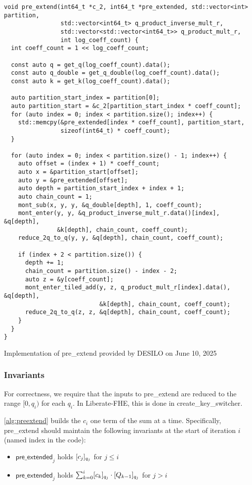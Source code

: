 \documentclass{article}
\begin{document}
\begin{listing}
\begin{verbatim}
void pre_extend(int64_t *c_2, int64_t *pre_extended, std::vector<int> partition,
                std::vector<int64_t> q_product_inverse_mult_r,
                std::vector<std::vector<int64_t>> q_product_mult_r,
                int log_coeff_count) {
  int coeff_count = 1 << log_coeff_count;

  const auto q = get_q(log_coeff_count).data();
  const auto q_double = get_q_double(log_coeff_count).data();
  const auto k = get_k(log_coeff_count).data();

  auto partition_start_index = partition[0];
  auto partition_start = &c_2[partition_start_index * coeff_count];
  for (auto index = 0; index < partition.size(); index++) {
    std::memcpy(&pre_extended[index * coeff_count], partition_start,
                sizeof(int64_t) * coeff_count);
  }

  for (auto index = 0; index < partition.size() - 1; index++) {
    auto offset = (index + 1) * coeff_count;
    auto x = &partition_start[offset];
    auto y = &pre_extended[offset];
    auto depth = partition_start_index + index + 1;
    auto chain_count = 1;
    mont_sub(x, y, y, &q_double[depth], 1, coeff_count);
    mont_enter(y, y, &q_product_inverse_mult_r.data()[index], &q[depth],
               &k[depth], chain_count, coeff_count);
    reduce_2q_to_q(y, y, &q[depth], chain_count, coeff_count);

    if (index + 2 < partition.size()) {
      depth += 1;
      chain_count = partition.size() - index - 2;
      auto z = &y[coeff_count];
      mont_enter_tiled_add(y, z, q_product_mult_r[index].data(), &q[depth],
                           &k[depth], chain_count, coeff_count);
      reduce_2q_to_q(z, z, &q[depth], chain_count, coeff_count);
    }
  }
}
\end{verbatim}
\caption{Implementation of \textsf{pre\_extend} provided by DESILO on June 10, 2025}
\label{alg:preextend}
\end{listing}

\subsubsection{Invariants}
For correctness, we require that the inputs to \textsf{pre\_extend} are reduced to the range $[0, q_i)$ for each $q_i$. In Liberate-FHE, this is done in \textsf{create\_key\_switcher}.

\cref{alg:preextend} builds the $c_i$ one term of the sum at a time. Specifically, \textsf{pre\_extend} should maintain the following invariants at the start of iteration $i$ (named \textsf{index} in the code):
\begin{itemize}
    \item $\mathsf{pre\_extended}_j$ holds $[c_j]_{q_j}$ for $j\le i$
    \item $\mathsf{pre\_extended}_j$ holds $\sum_{k=0}^i[c_k]_{q_j}\cdot[Q_{k-1}]_{q_j}$ for $j>i$
\end{itemize}
\end{document}
